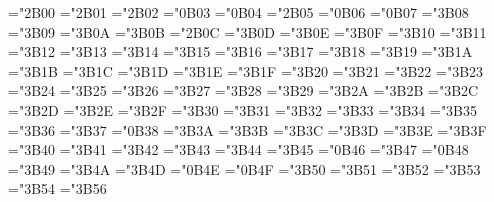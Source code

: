 \mathchardef\boxdot="2B00
\mathchardef\boxplus="2B01
\mathchardef\boxtimes="2B02
\mathchardef\square="0B03
\mathchardef\blacksquare="0B04
\mathchardef\centerdot="2B05
\mathchardef\lozenge="0B06
\mathchardef\blacklozenge="0B07
\mathchardef\circlearrowright="3B08
\mathchardef\circlearrowleft="3B09
\mathchardef\rightleftharpoons="3B0A
\mathchardef\leftrightharpoons="3B0B
\mathchardef\boxminus="2B0C
\mathchardef\Vdash="3B0D
\mathchardef\Vvdash="3B0E
\mathchardef\vDash="3B0F
\mathchardef\twoheadrightarrow="3B10
\mathchardef\twoheadleftarrow="3B11
\mathchardef\leftleftarrows="3B12
\mathchardef\rightrightarrows="3B13
\mathchardef\upuparrows="3B14
\mathchardef\downdownarrows="3B15
\mathchardef\upharpoonright="3B16
\let\restriction=\upharpoonright
\mathchardef\downharpoonright="3B17
\mathchardef\upharpoonleft="3B18
\mathchardef\downharpoonleft="3B19
\mathchardef\rightarrowtail="3B1A
\mathchardef\leftarrowtail="3B1B
\mathchardef\leftrightarrows="3B1C
\mathchardef\rightleftarrows="3B1D
\mathchardef\Lsh="3B1E
\mathchardef\Rsh="3B1F
\mathchardef\rightsquigarrow="3B20
\mathchardef\leftrightsquigarrow="3B21
\mathchardef\looparrowleft="3B22
\mathchardef\looparrowright="3B23
\mathchardef\circeq="3B24
\mathchardef\succsim="3B25
\mathchardef\gtrsim="3B26
\mathchardef\gtrapprox="3B27
\mathchardef\multimap="3B28
\mathchardef\therefore="3B29
\mathchardef\because="3B2A
\mathchardef\doteqdot="3B2B
\let\Doteq=\doteqdot
\mathchardef\triangleq="3B2C
\mathchardef\precsim="3B2D
\mathchardef\lesssim="3B2E
\mathchardef\lessapprox="3B2F
\mathchardef\eqslantless="3B30
\mathchardef\eqslantgtr="3B31
\mathchardef\curlyeqprec="3B32
\mathchardef\curlyeqsucc="3B33
\mathchardef\preccurlyeq="3B34
\mathchardef\leqq="3B35
\mathchardef\leqslant="3B36
\mathchardef\lessgtr="3B37
\mathchardef\backprime="0B38
\mathchardef\risingdotseq="3B3A
\mathchardef\fallingdotseq="3B3B
\mathchardef\succcurlyeq="3B3C
\mathchardef\geqq="3B3D
\mathchardef\geqslant="3B3E
\mathchardef\gtrless="3B3F
\mathchardef\sqsubset="3B40
\mathchardef\sqsupset="3B41
\mathchardef\vartriangleright="3B42
\mathchardef\vartriangleleft="3B43
\mathchardef\trianglerighteq="3B44
\mathchardef\trianglelefteq="3B45
\mathchardef\bigstar="0B46
\mathchardef\between="3B47
\mathchardef\blacktriangledown="0B48
\mathchardef\blacktriangleright="3B49
\mathchardef\blacktriangleleft="3B4A
\mathchardef\vartriangle="3B4D
\mathchardef\blacktriangle="0B4E
\mathchardef\triangledown="0B4F
\mathchardef\eqcirc="3B50
\mathchardef\lesseqgtr="3B51
\mathchardef\gtreqless="3B52
\mathchardef\lesseqqgtr="3B53
\mathchardef\gtreqqless="3B54
\mathchardef\Rrightarrow="3B56
